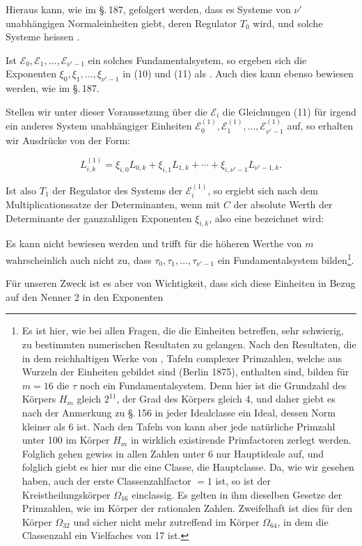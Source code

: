 
Hieraus kann, wie im \S.\,187, gefolgert werden, dass es Systeme von $\nu'$ unabhängigen Normaleinheiten giebt, deren Regulator $T_0$  wird, und solche Systeme heissen .

Ist $\mathcal{E}_0, \mathcal{E}_1, \ldots, \mathcal{E}_{\nu'-1}$ ein solches Fundamentalsystem, so ergeben sich die Exponenten $\xi_0, \xi_1, \ldots, \xi_{\nu'-1}$ in (10) und (11) als . Auch dies kann ebenso bewiesen werden, wie im \S.\,187.

Stellen wir unter dieser Voraussetzung über die $\mathcal{E}_i$ die Gleichungen (11) für irgend ein anderes System unabhängiger Einheiten $\mathcal{E}_0^{(1)}, \mathcal{E}_1^{(1)}, \ldots, \mathcal{E}_{\nu'-1}^{(1)}$ auf, so erhalten wir Ausdrücke von der Form:

\[
L_{i,k}^{(1)} = \xi_{i,0} L_{0,k} + \xi_{i,1} L_{1,k} + \cdots + \xi_{i,\nu'-1} L_{\nu'-1,k}.
\]

Ist also $T_1$ der Regulator des Systems der $\mathcal{E}_i^{(1)}$, so ergiebt sich nach dem Multiplicationssatze der Determinanten, wenn mit $C$ der absolute Werth der Determinante der ganzzahligen Exponenten $\xi_{i,k}$, also eine  bezeichnet wird:


Es kann nicht bewiesen werden und trifft für die höheren Werthe von $m$ wahrscheinlich auch nicht zu, dass $\tau_0, \tau_1, \ldots, \tau_{\nu'-1}$ ein Fundamentalsystem bilden\footnote{Es ist hier, wie bei allen Fragen, die die Einheiten betreffen, sehr schwierig, zu bestimmten numerischen Resultaten zu gelangen. Nach den Resultaten, die in dem reichhaltigen Werke von , \glqq Tafeln complexer Primzahlen, welche aus Wurzeln der Einheiten gebildet sind\grqq{} (Berlin 1875), enthalten sind, bilden für $m=16$ die $\tau$ noch ein Fundamentalsystem. Denn hier ist die Grundzahl des Körpers $H_m$ gleich $2^{11}$, der Grad des Körpers gleich 4, und daher giebt es nach der Anmerkung zu \S.\,156 in jeder Idealclasse ein Ideal, dessen Norm kleiner als 6 ist. Nach den Tafeln von  kann aber jede natürliche Primzahl unter 100 im Körper $H_m$ in wirklich existirende Primfactoren zerlegt werden. Folglich gehen gewiss in allen Zahlen unter 6 nur Hauptideale auf, und folglich giebt es hier nur die eine Classe, die Hauptclasse. Da, wie wir gesehen haben, auch der erste Classenzahlfactor $=1$ ist, so ist der Kreistheilungskörper $\Omega_{16}$ einclassig. Es gelten in ihm dieselben Gesetze der Primzahlen, wie im Körper der rationalen Zahlen. Zweifelhaft ist dies für den Körper $\Omega_{32}$ und sicher nicht mehr zutreffend im Körper $\Omega_{64}$, in dem die Classenzahl ein Vielfaches von 17 ist.}.

Für unseren Zweck ist es aber von Wichtigkeit, dass sich diese Einheiten in Bezug auf den Nenner 2 in den Exponenten
